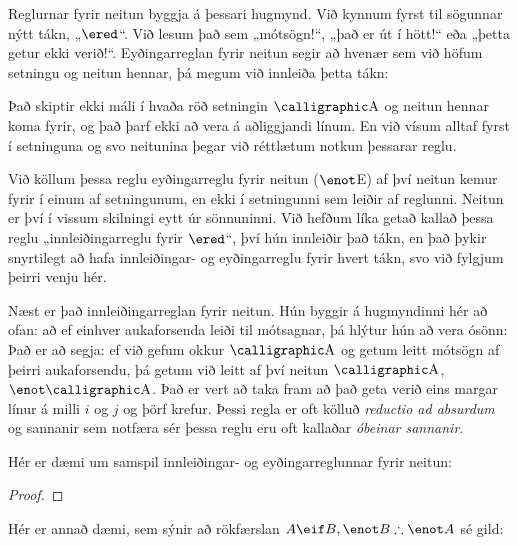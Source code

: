 Reglurnar fyrir neitun byggja á þessari hugmynd. Við kynnum fyrst til sögunnar nýtt tákn, „$\ered$“. Við lesum það sem „mótsögn!“, „það er út í hött!“ eða „þetta getur ekki verið!“. Eyðingarreglan fyrir neitun segir að hvenær sem við höfum setningu og neitun hennar, þá megum við innleiða þetta tákn:

Það skiptir ekki máli í hvaða röð setningin $\meta{A}$ og neitun hennar koma fyrir, og það þarf ekki að vera á aðliggjandi línum. En við vísum alltaf fyrst í setninguna og svo neitunina þegar við réttlætum notkun þessarar reglu. 

Við köllum þessa reglu eyðingarreglu fyrir neitun ($\enot$E) af því neitun kemur fyrir í einum af setningunum, en ekki í setningunni sem leiðir af reglunni. Neitun er því í vissum skilningi eytt úr sönnuninni. Við hefðum líka getað kallað þessa reglu „innleiðingarreglu fyrir $\ered$“, því hún innleiðir það tákn, en það þykir snyrtilegt að hafa innleiðingar- og eyðingarreglu fyrir hvert tákn, svo við fylgjum þeirri venju hér.

Næst er það innleiðingarreglan fyrir neitun. Hún byggir á hugmyndinni hér að ofan: að ef einhver aukaforsenda leiði til mótsagnar, þá hlýtur hún að vera ósönn:
Það er að segja: ef við gefum okkur $\meta{A}$ og getum leitt mótsögn af þeirri aukaforsendu, þá getum við leitt af því neitun $\meta{A}$, $\enot \meta{A}$. Það er vert að taka fram að það geta verið eins margar línur á milli $i$ og $j$ og þörf krefur. Þessi regla er oft kölluð \emph{reductio ad absurdum} og sannanir sem notfæra sér þessa reglu eru oft kallaðar \emph{óbeinar sannanir}.

Hér er dæmi um samspil innleiðingar- og eyðingarreglunnar fyrir neitun:

\begin{proof}
	\open
	\close
\end{proof}

Hér er annað dæmi, sem sýnir að rökfærslan $A \eif B, \enot B \therefore \enot A$ sé gild:

